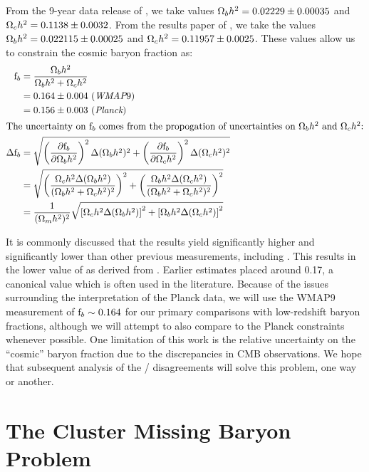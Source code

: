 From the 9-year data release of \WMAP{} \citep[,][]{Hinshaw2013},
we take values $\Omega_b h^2 = 0.02229 \pm 0.00035$ and $\Omega_c h^2 =
0.1138 \pm 0.0032$. From the results paper of \Planck{}
\citep{PlanckResultsXVI}, we take the values $\Omega_b h^2 = 0.022115
\pm 0.00025$ and $\Omega_c h^2 = 0.11957 \pm 0.0025$. These values
allow us to constrain the cosmic baryon fraction as:
\begin{align}
\textrm{f\ensuremath{_b}} &= \frac{\Omega_b h^2}{\Omega_b h^2 + \Omega_c h^2} \\
&=0.164 \pm 0.004 \,\,(\textit{WMAP}9) \nonumber\\
&= 0.156 \pm 0.003\,\,(\textit{Planck}) \nonumber\\ 
\intertext{The uncertainty on \textrm{f\ensuremath{_b}}{} comes from the propogation of
  uncertainties on $\Omega_b h^2$ and $\Omega_c h^2$:}
\Delta\textrm{f\ensuremath{_b}} &=
\sqrt{\left(\frac{\partial\textrm{f\ensuremath{_b}}}{\partial\Omega_b h^2}\right)^2\Delta(\Omega_b h^2)^2 
+ \left(\frac{\partial\textrm{f\ensuremath{_b}}}{\partial\Omega_c h^2}\right)^2\Delta(\Omega_c h^2)^2} \nonumber \\
&= \sqrt{\left(\frac{\Omega_c h^2 \Delta(\Omega_b h^2)}{(\Omega_b h^2 + \Omega_c h^2)^2}\right)^2
+ \left(\frac{\Omega_b h^2 \Delta(\Omega_c h^2)}{(\Omega_b h^2 + \Omega_c h^2)^2}\right)^2} \nonumber \\
&= \frac{1}{(\Omega_m h^2)^2}\sqrt{\left[\Omega_c h^2 \Delta(\Omega_b h^2)\right]^2
+ \left[\Omega_b h^2 \Delta(\Omega_c h^2)\right]^2} 
\end{align}

It is commonly discussed  that the \Planck{}
results yield \omegam{} significantly higher and \Ho{} significantly
lower than other previous measurements, including \WMAP{}. This results
in the lower value of \fb{} as derived from \Planck{}. Earlier
estimates \citep[e.g.,,][]{Dunkley2009} placed \fb{}
around 0.17, a canonical value which is often used in the
literature. Because of the issues surrounding the interpretation of
the Planck data, we will use the WMAP9 measurement of $\textrm{f\ensuremath{_b}}{}\sim0.164$
for our primary comparisons with low-redshift baryon fractions,
although we will attempt to also compare to the Planck constraints
whenever possible. One limitation of this work is the relative
uncertainty on the ``cosmic'' baryon fraction due to the
discrepancies in CMB observations. We hope that subsequent
analysis of the \WMAP/\Planck{} disagreements will solve this problem, one
way or another.



\section{The Cluster Missing Baryon Problem}
\label{sec:Missing.Clusters}

